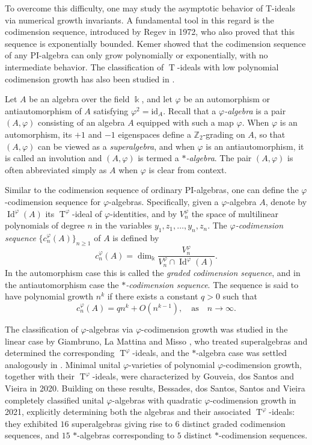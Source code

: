 \documentclass{amsart}
\theoremstyle{definition}
\theoremstyle{remark}
\numberwithin{equation}{section}
\def \vp{\varphi}
\def \k{\Bbbk}
\def \Z{\mathbb{Z}}
\def \Id{\operatorname{Id}}
\def \T{\operatorname{T}}
\def \id{\mathrm{id}}
\begin{document}
	To overcome this difficulty, one may study the asymptotic behavior of T-ideals via numerical growth invariants. A fundamental tool in this regard is the codimension sequence, introduced by Regev \cite{Re} in 1972, who also proved that this sequence is exponentially bounded. Kemer \cite{Ke79} showed that the codimension sequence of any PI-algebra can only grow polynomially or exponentially, with no intermediate behavior. The classification of $\T$-ideals with low polynomial codimension growth has also been studied in \cite{BFXYZZZ,BYZ,GM,GMP,GMZ,OV}.

	Let $A$ be an algebra over the field $\k$, and let $\vp$ be an automorphism or antiautomorphism of $A$ satisfying $\vp^2 = \id_A$. Recall that a \emph{$\vp$-algebra} is a pair $(A,\vp)$ consisting of an algebra $A$ equipped with such a map $\vp$. When $\vp$ is an automorphism, its $+1$ and $-1$ eigenspaces define a $\Z_2$-grading on $A$, so that $(A,\vp)$ can be viewed as a \emph{superalgebra}, and when $\vp$ is an antiautomorphism, it is called an involution and $(A,\vp)$ is termed a \emph{$*$-algebra}. The pair $(A,\vp)$ is often abbreviated simply as $A$ when $\vp$ is clear from context.

	Similar to the codimension sequence of ordinary PI-algebras, one can define the $\vp$-codimension sequence for $\vp$-algebras. Specifically, given a $\vp$-algebra $A$, denote by $\Id^\vp(A)$ its $\T^\vp$-ideal of $\vp$-identities, and by $V_n^\vp$ the space of multilinear polynomials of degree $n$ in the variables $y_1,z_1,\dots,y_n,z_n$. The \emph{$\vp$-codimension sequence} $\{c_n^\vp(A)\}_{n \ge 1}$ of $A$ is defined by
	\[
	c_n^\vp(A) = \dim_\k \frac{V_n^\vp}{V_n^\vp \cap \Id^\vp(A)}.
	\]
	In the automorphism case this is called the \emph{graded codimension sequence}, and in the antiautomorphism case the \emph{$*$-codimension sequence}. The sequence is said to have polynomial growth $n^k$ if there exists a constant $q > 0$ such that
	\[
	c_n^\vp(A) = q n^k + O(n^{k-1}), \quad  \text{as} \quad  n \to \infty.
	\]
	
	The classification of $\vp$-algebras via $\vp$-codimension growth was studied in the linear case by Giambruno, La Mattina and Misso \cite{GMM}, who treated superalgebras and determined the corresponding $\T^\vp$-ideals, and the $*$-algebra case was settled analogously in \cite{MM}. Minimal unital $\vp$-varieties of polynomial $\vp$-codimension growth, together with their $\T^\vp$-ideals, were characterized by Gouveia, dos Santos and Vieira \cite{GSV} in 2020. Building on these results, Bessades, dos Santos, Santos and Vieira \cite{BSSV} completely classified unital $\vp$-algebras with quadratic $\vp$-codimension growth in 2021, explicitly determining both the algebras and their associated $\T^\vp$-ideals: they exhibited $16$ superalgebras giving rise to $6$ distinct graded codimension sequences, and $15$ $*$-algebras corresponding to $5$ distinct $*$-codimension sequences.
	
\end{document}
